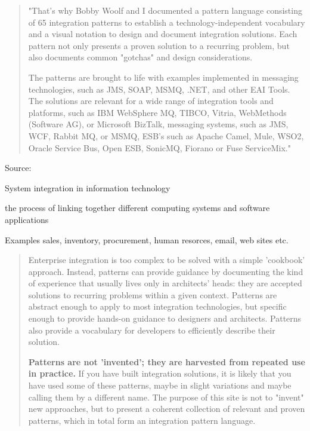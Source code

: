 \documentclass[Screen16to9,17pt]{foils}
\begin{document}



\begin{quote}
"That's why Bobby Woolf and I documented a pattern language consisting of 65 integration patterns to establish a technology-independent vocabulary and a visual notation to design and document integration solutions. Each pattern not only presents a proven solution to a recurring problem, but also documents common "gotchas" and design considerations.

The patterns are brought to life with examples implemented in messaging technologies, such as JMS, SOAP, MSMQ, .NET, and other EAI Tools. The solutions are relevant for a wide range of integration tools and platforms, such as IBM WebSphere MQ, TIBCO, Vitria, WebMethods (Software AG), or Microsoft BizTalk, messaging systems, such as JMS, WCF, Rabbit MQ, or MSMQ, ESB's such as Apache Camel, Mule, WSO2, Oracle Service Bus, Open ESB, SonicMQ, Fiorano or Fuse ServiceMix."
\end{quote}

Source:\\


\begin{list2}
\item System integration in information technology
\item the process of linking together different computing systems and software applications
\item Examples sales, inventory, procurement, human resorces, email, web sites etc.
\end{list2}



\begin{quote}
Enterprise integration is too complex to be solved with a simple 'cookbook' approach. Instead, patterns can provide guidance by documenting the kind of experience that usually lives only in architects' heads: they are accepted solutions to recurring problems within a given context. Patterns are abstract enough to apply to most integration technologies, but specific enough to provide hands-on guidance to designers and architects. Patterns also provide a vocabulary for developers to efficiently describe their solution.

{\bf
Patterns are not 'invented'; they are harvested from repeated use in practice.} If you have built integration solutions, it is likely that you have used some of these patterns, maybe in slight variations and maybe calling them by a different name. The purpose of this site is not to "invent" new approaches, but to present a coherent collection of relevant and proven patterns, which in total form an integration pattern language.
\end{quote}
\end{document}
